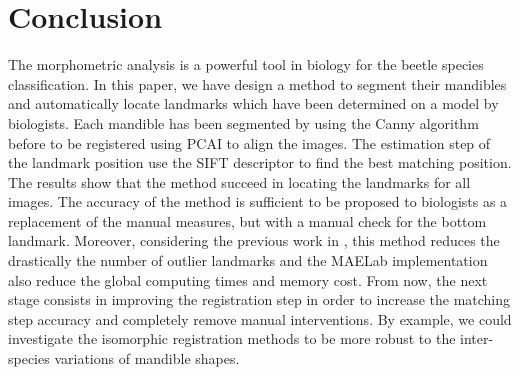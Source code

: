 \documentclass[twoside,twocolumn,10pt]{article}
\begin{document}
\section{Conclusion}

The morphometric analysis is a powerful tool in biology for the beetle species classification.
In this paper, we have design a method to segment their mandibles and automatically locate landmarks which have been determined on a model by biologists.
Each mandible has been segmented by using the Canny algorithm before to be registered using PCAI to align the images.
The estimation step of the landmark position use the SIFT descriptor to find the best matching position.
The results show that the method succeed in locating the landmarks for all images.
The accuracy of the method is sufficient to be proposed to biologists as a replacement of the manual measures, but with a manual check for the bottom landmark.
Moreover, considering the previous work in \cite{leestimating}, this method reduces the drastically the number of outlier landmarks and the MAELab implementation also reduce the global computing times and memory cost.
From now, the next stage consists in improving the registration step in order to increase the matching step accuracy and completely remove manual interventions.
By example, we could investigate the isomorphic registration methods to be more robust to the inter-species variations of mandible shapes.






\end{document}

